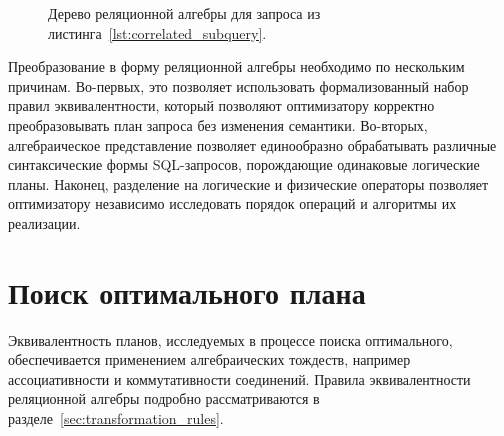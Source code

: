 \documentclass[fontsize=14pt, russian]{scrartcl}
\begin{document}
\begin{figure}[!htb]\centering
{}
\caption{Дерево реляционной алгебры для запроса из
листинга~\ref{lst:correlated_subquery}.}%
\label{fig:correlated_subquery_tree}
\end{figure}

Преобразование в форму реляционной алгебры необходимо по нескольким причинам.
Во-первых, это позволяет использовать формализованный набор правил
эквивалентности, который позволяют оптимизатору корректно преобразовывать план
запроса без изменения семантики. Во-вторых, алгебраическое представление
позволяет единообразно обрабатывать различные синтаксические формы SQL-запросов,
порождающие одинаковые логические планы. Наконец, разделение на логические и
физические операторы позволяет оптимизатору независимо исследовать порядок
операций и алгоритмы их реализации.

\section{Поиск оптимального плана}

Эквивалентность планов, исследуемых в процессе поиска оптимального,
обеспечивается применением алгебраических тождеств, например ассоциативности и
коммутативности соединений. Правила эквивалентности реляционной алгебры подробно
рассматриваются в разделе~\ref{sec:transformation_rules}.
\end{document}
